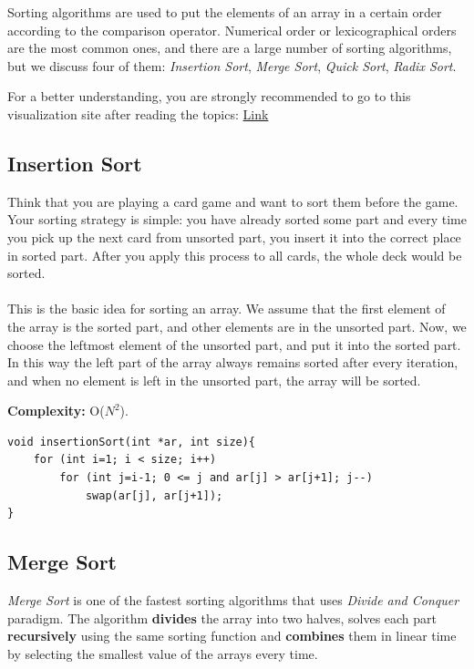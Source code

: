 \documentclass[12pt]{article}
\begin{document}
	
	Sorting algorithms are used to put the elements of an array in a certain order according to the comparison operator. Numerical order or lexicographical orders are the most common ones, and there are a large number of sorting algorithms, but we discuss four of them: \textit{Insertion Sort}, \textit{Merge Sort}, \textit{Quick Sort}, \textit{Radix Sort}. 
	
	For a better understanding, you are strongly recommended to go to this visualization site after reading the topics: \href{https://visualgo.net/en/sorting}{Link}
	
		\subsection{Insertion Sort}
		
Think that you are playing a card game and want to sort them before the game. Your sorting strategy is simple: you have already sorted some part and every time you pick up the next card from unsorted part, you insert it into the correct place in sorted part. After you apply this process to all cards, the whole deck would be sorted. \\ \\
This is the basic idea for sorting an array. We assume that the first element of the array is the sorted part, and other elements are in the unsorted part. Now, we choose the leftmost element of the unsorted part, and put it into the sorted part. In this way the left part of the array always remains sorted after every iteration, and when no element is left in the unsorted part, the array will be sorted. 

\textbf{Complexity: }
    O($N^{2}$).
	
\begin{verbatim}
void insertionSort(int *ar, int size){
    for (int i=1; i < size; i++)
        for (int j=i-1; 0 <= j and ar[j] > ar[j+1]; j--)
            swap(ar[j], ar[j+1]);
}
\end{verbatim}

\cleardoublepage

		\subsection{Merge Sort}

\textit{Merge Sort} is one of the fastest sorting algorithms that uses \textit{Divide and Conquer} paradigm. The algorithm \textbf{divides} the array into two halves, solves each part \textbf{recursively} using the same sorting function and \textbf{combines} them in linear time by selecting the smallest value of the arrays every time.
\end{document}
